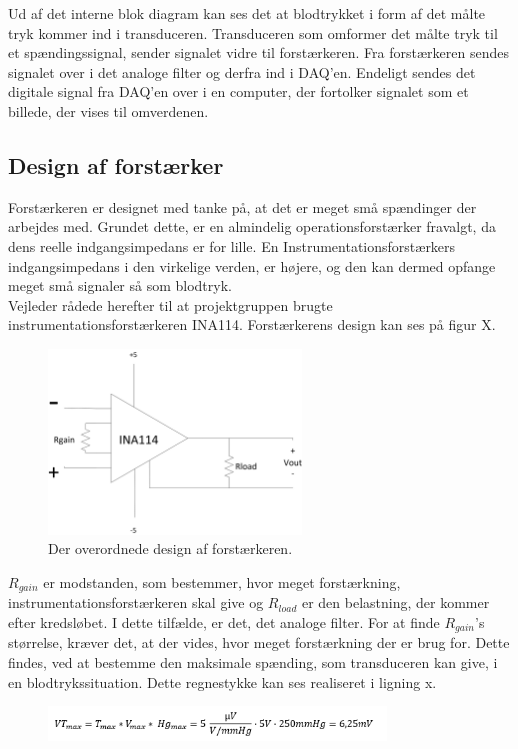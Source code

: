 Ud af det interne blok diagram kan ses det at blodtrykket i form af det målte tryk kommer ind i transduceren. Transduceren som omformer det målte tryk til et spændingssignal, sender signalet vidre til forstærkeren. Fra forstærkeren sendes signalet over i det analoge filter og derfra ind i DAQ'en. Endeligt sendes det digitale signal fra DAQ'en over i en computer, der fortolker signalet som et billede, der vises til omverdenen.

\subsection{Design af forstærker}
Forstærkeren er designet med tanke på, at det er meget små spændinger der arbejdes med. Grundet dette, er en almindelig operationsforstærker fravalgt, da dens reelle indgangsimpedans er for lille. En Instrumentationsforstærkers indgangsimpedans i den virkelige verden, er højere, og den kan dermed opfange meget små signaler så som blodtryk.\\
Vejleder rådede herefter til at projektgruppen brugte instrumentationsforstærkeren INA114. Forstærkerens design kan ses på figur X.\\ 
\begin{figure}[H]
	\centering
	\includegraphics[width=0.6\textwidth]{Figurer/Hardware/Forstaerker}
	\caption{Der overordnede design af forstærkeren.}\label{labelpic}
\end{figure}
$R_{gain}$ er modstanden, som bestemmer, hvor meget forstærkning, instrumentationsforstærkeren skal give og $R_{load}$ er den belastning, der kommer efter kredsløbet. I dette tilfælde, er det, det analoge filter. For at finde $R_{gain}$’s størrelse, kræver det, at der vides, hvor meget forstærkning der er brug for. Dette findes, ved at bestemme den maksimale spænding, som transduceren kan give, i en blodtrykssituation. Dette regnestykke kan ses realiseret i ligning x.\\
\begin{figure}[H]
	\centering
	\includegraphics[width=0.8\textwidth]{Figurer/Hardware/LigningSara}
\end{figure}

